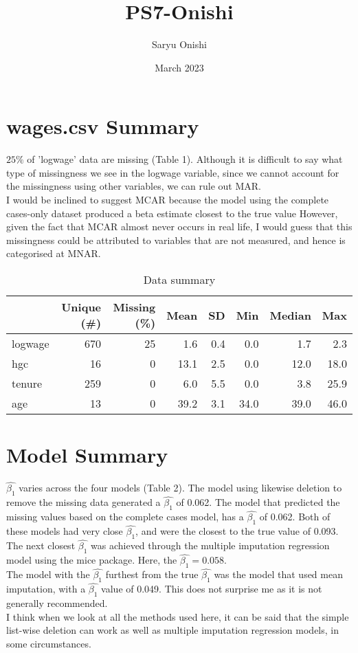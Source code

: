\documentclass{article}
\begin{document}
\title{PS7-Onishi}
\author{Saryu Onishi}
\date{March 2023}
\maketitle

\section{wages.csv Summary}
$25\%$ of 'logwage' data are missing (Table 1). Although it is difficult to say what type of missingness we see in the logwage variable, since we cannot account for the missingness using other variables, we can rule out MAR. \\
I would be inclined to suggest MCAR because the model using the complete cases-only dataset produced a beta estimate closest to the true value However, given the fact that MCAR almost never occurs in real life, I would guess that this missingness could be attributed to variables that are not measured, and hence is categorised at MNAR.
\begin{table}[ht]
    \centering
    \begin{tabular}[t]{lrrrrrrr}
    \toprule
      & Unique (\#) & Missing (\%) & Mean & SD & Min & Median & Max\\
    \midrule
    logwage & 670 & 25 & \num{1.6} & \num{0.4} & \num{0.0} & \num{1.7} & \num{2.3}\\
    hgc & 16 & 0 & \num{13.1} & \num{2.5} & \num{0.0} & \num{12.0} & \num{18.0}\\
    tenure & 259 & 0 & \num{6.0} & \num{5.5} & \num{0.0} & \num{3.8} & \num{25.9}\\
    age & 13 & 0 & \num{39.2} & \num{3.1} & \num{34.0} & \num{39.0} & \num{46.0}\\
    \bottomrule
    \end{tabular}
    \caption{Data summary}
    \label{Table:1}
\end{table}

\section{Model Summary}
$\hat{\beta_1}$ varies across the four models (Table 2). The model using likewise deletion to remove the missing data generated a $\hat{\beta_1}$ of 0.062. The model that predicted the missing values based on the complete cases model, has a $\hat{\beta_1}$ of 0.062. Both of these models had very close $\hat{\beta_1}$, and were the closest to the true value of 0.093.\\
The next closest $\hat{\beta_1}$  was achieved through the multiple imputation regression model using the mice package. Here, the $\hat{\beta_1}=0.058$.\\
The model with the $\hat{\beta_1}$ furthest from the true $\hat{\beta_1}$ was the model that used mean imputation, with a $\hat{\beta_1}$ value of 0.049. This does not surprise me as it is not generally recommended. \\
I think when we look at all the methods used here, it can be said that the simple list-wise deletion can work as well as multiple imputation regression models, in some circumstances.
\end{document}
